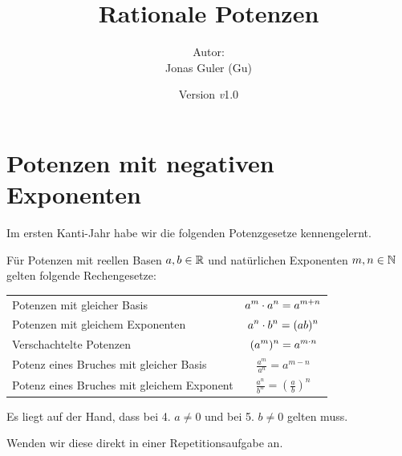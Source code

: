\documentclass[11pt,oneside]{article}
\newcommand{\Skriptname}{Rationale Potenzen}
\newcommand{\Autor}{Jonas Guler (Gu)}
\newcommand{\version}{\textit{v}1.0}
\begin{document}
\begin{titlepage}
	\clearpage
	\title{\Huge\textbf{\Skriptname} \\[1cm]}
	\author{Autor:\\ \Autor}
	\date{\normalsize {Version \version}\\ \datelong}
	\maketitle
	\thispagestyle{empty}
	\vfill
	\tableofcontents
\end{titlepage}
\section{Potenzen mit negativen Exponenten}
	Im ersten Kanti-Jahr habe wir die folgenden Potenzgesetze kennengelernt.
	\begin{satz}
		Für Potenzen mit reellen Basen $a,b\in\mathbb{R}$ und natürlichen Exponenten $m,n\in\mathbb{N} $ gelten folgende Rechengesetze:
		\begingroup
		\renewcommand{\arraystretch}{2}
		\begin{table}[H]
			\centering
			\begin{tabular}{l c}
				Potenzen mit gleicher Basis & $\displaystyle a^{m}\cdot a^{n}=a^{m+n}$ \\
				Potenzen mit gleichem Exponenten & $\displaystyle a^{n}\cdot b^{n}=(ab)^n$ \\
				Verschachtelte Potenzen & $\displaystyle(a^{m})^{n}=a^{m\cdot n}$ \\
				Potenz eines Bruches mit gleicher Basis & $\displaystyle\frac{a^m}{a^n}=a^{m-n}$ \\
				Potenz eines Bruches mit gleichem Exponent & $\displaystyle\frac{a^n}{b^n}=\left(\frac{a}{b}\right)^n$ \\
			\end{tabular}
		\end{table}
		\endgroup
		Es liegt auf der Hand, dass bei 4. $a\neq0$ und bei 5. $b\neq0$ gelten muss.
	\end{satz}
	Wenden wir diese direkt in einer Repetitionsaufgabe an.
\end{document}
